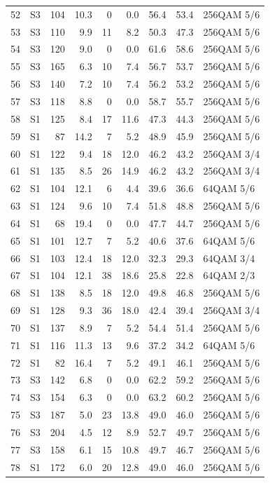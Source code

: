 \begin{longtable}{rlrrrrrrl}
52 & S3 & 104 & 10.3 & 0 & 0.0 & 56.4 & 53.4 & 256QAM 5/6\\
53 & S3 & 110 & 9.9 & 11 & 8.2 & 50.3 & 47.3 & 256QAM 5/6\\
54 & S3 & 120 & 9.0 & 0 & 0.0 & 61.6 & 58.6 & 256QAM 5/6\\
55 & S3 & 165 & 6.3 & 10 & 7.4 & 56.7 & 53.7 & 256QAM 5/6\\
56 & S3 & 140 & 7.2 & 10 & 7.4 & 56.2 & 53.2 & 256QAM 5/6\\
57 & S3 & 118 & 8.8 & 0 & 0.0 & 58.7 & 55.7 & 256QAM 5/6\\
58 & S1 & 125 & 8.4 & 17 & 11.6 & 47.3 & 44.3 & 256QAM 5/6\\
59 & S1 & 87 & 14.2 & 7 & 5.2 & 48.9 & 45.9 & 256QAM 5/6\\
60 & S1 & 122 & 9.4 & 18 & 12.0 & 46.2 & 43.2 & 256QAM 3/4\\
61 & S1 & 135 & 8.5 & 26 & 14.9 & 46.2 & 43.2 & 256QAM 3/4\\
62 & S1 & 104 & 12.1 & 6 & 4.4 & 39.6 & 36.6 & 64QAM 5/6\\
63 & S1 & 124 & 9.6 & 10 & 7.4 & 51.8 & 48.8 & 256QAM 5/6\\
64 & S1 & 68 & 19.4 & 0 & 0.0 & 47.7 & 44.7 & 256QAM 5/6\\
65 & S1 & 101 & 12.7 & 7 & 5.2 & 40.6 & 37.6 & 64QAM 5/6\\
66 & S1 & 103 & 12.4 & 18 & 12.0 & 32.3 & 29.3 & 64QAM 3/4\\
67 & S1 & 104 & 12.1 & 38 & 18.6 & 25.8 & 22.8 & 64QAM 2/3\\
68 & S1 & 138 & 8.5 & 18 & 12.0 & 49.8 & 46.8 & 256QAM 5/6\\
69 & S1 & 128 & 9.3 & 36 & 18.0 & 42.4 & 39.4 & 256QAM 3/4\\
70 & S1 & 137 & 8.9 & 7 & 5.2 & 54.4 & 51.4 & 256QAM 5/6\\
71 & S1 & 116 & 11.3 & 13 & 9.6 & 37.2 & 34.2 & 64QAM 5/6\\
72 & S1 & 82 & 16.4 & 7 & 5.2 & 49.1 & 46.1 & 256QAM 5/6\\
73 & S3 & 142 & 6.8 & 0 & 0.0 & 62.2 & 59.2 & 256QAM 5/6\\
74 & S3 & 154 & 6.3 & 0 & 0.0 & 63.2 & 60.2 & 256QAM 5/6\\
75 & S3 & 187 & 5.0 & 23 & 13.8 & 49.0 & 46.0 & 256QAM 5/6\\
76 & S3 & 204 & 4.5 & 12 & 8.9 & 52.7 & 49.7 & 256QAM 5/6\\
77 & S3 & 158 & 6.1 & 15 & 10.8 & 49.7 & 46.7 & 256QAM 5/6\\
78 & S1 & 172 & 6.0 & 20 & 12.8 & 49.0 & 46.0 & 256QAM 5/6\\

\end{longtable}
